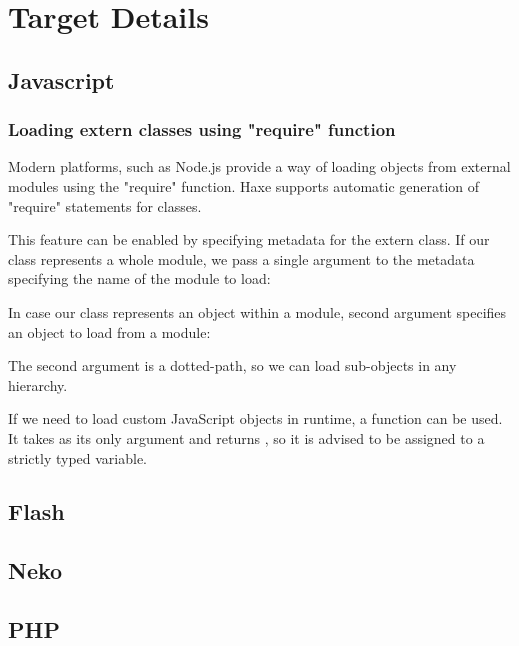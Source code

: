 \chapter{Target Details}
\label{target-details}

\section{Javascript}
\label{target-javascript}

\subsection{Loading extern classes using "require" function}
\label{target-javascript-require}

Modern  platforms, such as Node.js provide a way of loading objects
from external modules using the "require" function. Haxe supports automatic generation
of "require" statements for  classes.

This feature can be enabled by specifying  metadata for the extern class. If our  class represents a whole module, we pass a single argument to the  metadata specifying the name of the module to load:


In case our  class represents an object within a module, second  argument specifies an object to load from a module:


The second argument is a dotted-path, so we can load sub-objects in any hierarchy.

If we need to load custom JavaScript objects in runtime, a  function can be used. It takes  as its only argument and returns , so it is advised to be assigned to a strictly typed variable.

\section{Flash}
\label{target-flash}

\section{Neko}
\label{target-neko}

\section{PHP}
\label{target-php}

